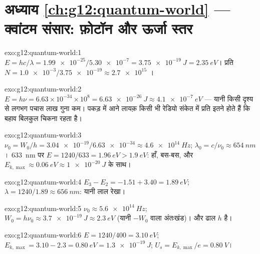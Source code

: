 \section*{अध्याय \ref{ch:g12:quantum-world} --- क्वांटम संसार: फ़ोटॉन और ऊर्जा स्तर}

\begin{solution}{exo:g12:quantum-world:1}
$E = hc/\lambda = \num{1.99e-25}/\num{5.30e-7} = \qty{3.75e-19}{J} =
\qty{2.35}{eV}$। प्रति  $N = \num{1.0e-3}/\num{3.75e-19} \approx \num{2.7e15}$ ।
\end{solution}

\begin{solution}{exo:g12:quantum-world:2}
$E = h\nu = 6.63\times10^{-34} \times 10^{8} = \qty{6.63e-26}{J}
\approx \qty{4.1e-7}{eV}$ --- यानी किसी दृश्य  से लगभग पचास लाख गुना कम। पकड़ में आने
लायक़ किसी भी रेडियो संकेत में प्रति  इतने  होते हैं
कि बहाव बिलकुल चिकना रहता है।
\end{solution}

\begin{solution}{exo:g12:quantum-world:3}
$\nu_0 = W_0/h = \num{3.04e-19}/\num{6.63e-34} \approx
\qty{4.6e14}{Hz}$; $\lambda_0 = c/\nu_0 \approx \qty{654}{nm}$। \qty{633}{nm} पर $E = 1240/633 = \qty{1.96}{eV} > \qty{1.9}{eV}$: हाँ, बस-बस, और $E_{k,\max} \approx \qty{0.06}{eV} \approx \qty{1e-20}{J}$ के साथ।
\end{solution}

\begin{solution}{exo:g12:quantum-world:4}
$E_3 - E_2 = -1.51 + 3.40 = \qty{1.89}{eV}$; $\lambda = 1240/1.89 \approx \qty{656}{nm}$: यानी लाल रेखा।
\end{solution}

\begin{solution}{exo:g12:quantum-world:5}
$\nu_0 \approx \qty{5.6e14}{Hz}$; $W_0 = h\nu_0 \approx
\qty{3.7e-19}{J} \approx \qty{2.3}{eV}$ (यानी $-W_0$ वाला अंतःखंड)। और ढाल 
$h$ है।
\end{solution}

\begin{solution}{exo:g12:quantum-world:6}
$E = 1240/400 = \qty{3.10}{eV}$; $E_{k,\max} = 3.10 - 2.3 =
\qty{0.80}{eV} = \qty{1.3e-19}{J}$; $U_s = E_{k,\max}/e =
\qty{0.80}{V}$।
\end{solution}

